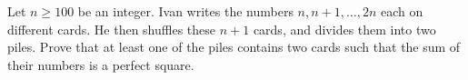 Let $n \ge 100$ be an integer.
Ivan writes the numbers $n, n+1, \dots, 2n$ each on different cards.
He then shuffles these $n+1$ cards, and divides them into two piles.
Prove that at least one of the piles contains two cards such that
the sum of their numbers is a perfect square.